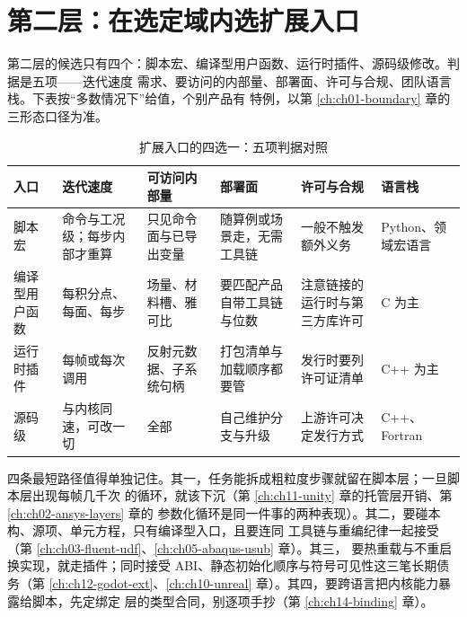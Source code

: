 \documentclass[12pt,a4paper,fontset=fandol]{ctexbook}
\newcommand{\Lang}[1]{\textsf{#1}}
\newcommand{\CL}{\Lang{C}}
\newcommand{\CPP}{\Lang{C++}}
\newcommand{\PY}{\Lang{Python}}
\begin{document}
\section{第二层：在选定域内选扩展入口}
\label{sec:ch18-entry-choice}

第二层的候选只有四个：脚本宏、编译型用户函数、运行时插件、源码级修改。判据是五项——迭代速度
需求、要访问的内部量、部署面、许可与合规、团队语言栈。下表按``多数情况下''给值，个别产品有
特例，以第 \ref{ch:ch01-boundary} 章的三形态口径为准。

\begin{table}[htbp]
\centering
\footnotesize
\setlength{\tabcolsep}{4pt}
\caption{扩展入口的四选一：五项判据对照}
\label{tab:ch18-entry-matrix}
\begin{tabular}{>{\raggedright\arraybackslash}p{}
                >{\raggedright\arraybackslash}p{}
                >{\raggedright\arraybackslash}p{}
                >{\raggedright\arraybackslash}p{}
                >{\raggedright\arraybackslash}p{}
                >{\raggedright\arraybackslash}p{}}
\toprule
\textbf{入口} & \textbf{迭代速度} & \textbf{可访问内部量} & \textbf{部署面} &
\textbf{许可与合规} & \textbf{语言栈} \\
\midrule
脚本宏 & 命令与工况级；每步内部才重算 & 只见命令面与已导出变量 & 随算例或场景走，无需工具链 &
一般不触发额外义务 & \PY{}、领域宏语言 \\
编译型用户函数 & 每积分点、每面、每步 & 场量、材料槽、雅可比 & 要匹配产品自带工具链与位数 &
注意链接的运行时与第三方库许可 & \CL{} 为主 \\
运行时插件 & 每帧或每次调用 & 反射元数据、子系统句柄 & 打包清单与加载顺序都要管 &
发行时要列许可证清单 & \CPP{} 为主 \\
源码级 & 与内核同速，可改一切 & 全部 & 自己维护分支与升级 & 上游许可决定发行方式 &
\CPP{}、\Lang{Fortran} \\
\bottomrule
\end{tabular}
\end{table}

四条最短路径值得单独记住。其一，任务能拆成粗粒度步骤就留在脚本层；一旦脚本层出现每帧几千次
的循环，就该下沉（第 \ref{ch:ch11-unity} 章的托管层开销、第 \ref{ch:ch02-ansys-layers} 章的
参数化循环是同一件事的两种表现）。其二，要碰本构、源项、单元方程，只有编译型入口，且要连同
工具链与重编纪律一起接受（第 \ref{ch:ch03-fluent-udf}、\ref{ch:ch05-abaqus-usub} 章）。其三，
要热重载与不重启换实现，就走插件；同时接受 ABI、静态初始化顺序与符号可见性这三笔长期债务（第
\ref{ch:ch12-godot-ext}、\ref{ch:ch10-unreal} 章）。其四，要跨语言把内核能力暴露给脚本，先定绑定
层的类型合同，别逐项手抄（第 \ref{ch:ch14-binding} 章）。
\end{document}
